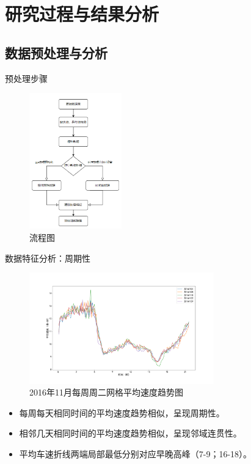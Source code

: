 \documentclass[10pt]{beamer}
\begin{document}
\section{研究过程与结果分析}
\subsection{数据预处理与分析}
\begin{frame}{预处理步骤}
    \begin{figure}
        \centering
        \includegraphics[width=4cm]{pic/流程图.png}
        \caption{流程图}
        \label{fig.workflow}
    \end{figure}
\end{frame}

\begin{frame}{数据特征分析：周期性}
    \begin{figure}
        \centering
        \includegraphics[width=8cm]{pic/五个周二平均速度线型图.png}
        \caption{2016年11月每周周二网格平均速度趋势图}
        \label{fig.period}
    \end{figure}
    \begin{itemize}
        \item 每周每天相同时间的平均速度趋势相似，呈现\alert{周期性}。
        \item 相邻几天相同时间的平均速度趋势相似，呈现\alert{邻域连贯性}。
        \item 平均车速折线两端\alert{局部最低}分别对应\alert{早晚高峰}（7-9；16-18）。
\end{itemize}
\end{frame}
\end{document}
